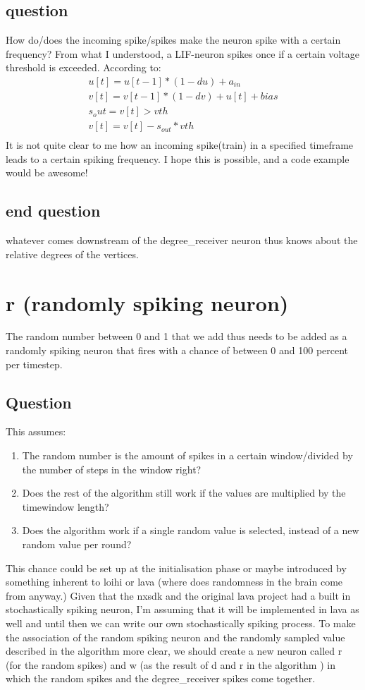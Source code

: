 \subsection{question}
How do/does the incoming spike/spikes make the neuron spike with a certain frequency? From what I understood, a LIF-neuron spikes once if a certain voltage threshold is exceeded. According to:
\begin{equation}
    \begin{split}
    u[t] = u[t-1] * (1-du) + a_{in} \\
    v[t] = v[t-1] * (1-dv) + u[t] + bias \\
    s_out = v[t] > vth \\
    v[t] = v[t] - s_{out}*vth \\
    \end{split}
\end{equation}
It is not quite clear to me how an incoming spike(train) in a specified timeframe leads to a certain spiking frequency. I hope this is possible, and a code example would be awesome!
\subsection{end question}
whatever comes downstream of the degree\_receiver neuron thus knows about the relative degrees of the
vertices.


\section{r (randomly spiking neuron)}\label{sec:random}
The random number between 0 and 1 that we add thus needs to be added as a
randomly spiking neuron that fires with a chance of between 0 and 100 percent
per timestep. 
\subsection{Question}
This assumes:
\begin{enumerate}
    \item The random number is the amount of spikes in a certain window/divided by the number of steps in the window right?
    \item Does the rest of the algorithm still work if the values are multiplied by the timewindow length?
    \item Does the algorithm work if a single random value is selected, instead of a new random value per round?
\end{enumerate}
This chance could be set up at the initialisation phase or maybe
introduced by something inherent to loihi or lava (where does randomness in
the brain come from anyway.) Given that the nxsdk and the original lava project
had a built in stochastically spiking neuron, I'm assuming that it will be
implemented in lava as well and until then we can write our own stochastically
spiking process. To make the association of the random spiking neuron and the
randomly sampled value described in the algorithm more clear, we should
create a new neuron called r (for the random spikes) and w (as the result of d
and r in the algorithm ) in which the random spikes and the degree\_receiver
spikes come together.


